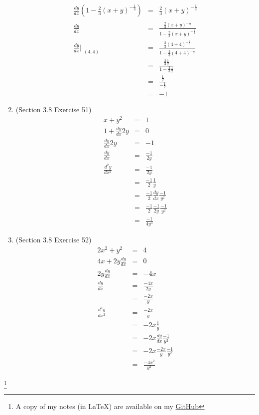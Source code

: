 \documentclass{article}
\newcommand\blfootnote[1]{
    \begingroup
    \renewcommand\thefootnote{}\footnote{#1}
    \addtocounter{footnote}{-1}
    \endgroup
}
\begin{document}
\begin{enumerate}
\begin{eqnarray}
            \frac{dy}{dx}\left(1 - \frac{2}{3}\left(x + y\right)^{-\frac{1}{3}}\right) &=& \frac{2}{3}\left(x + y\right)^{-\frac{1}{3}} \\
            \frac{dy}{dx} &=& \frac{\frac{2}{3}\left(x + y\right)^{-\frac{1}{3}}}{1 - \frac{2}{3}\left(x + y\right)^{-\frac{1}{3}}} \\
            \frac{dy}{dx}\Bigr|_{\substack{(4,4)}} &=& \frac{\frac{2}{3}\left(4 + 4\right)^{-\frac{1}{3}}}{1 - \frac{2}{3}\left(4 + 4\right)^{-\frac{1}{3}}} \\
                                                   &=& \frac{\frac{2}{3}\frac{1}{2}}{1 - \frac{2}{3}\frac{1}{2}} \\
                                                   &=& \frac{\frac{1}{2}}{- \frac{1}{2}} \\
                                                   &=& -1
        \end{eqnarray}
    \item (Section 3.8 Exercise 51)
        \begin{eqnarray}
            x + y^2 &=& 1 \\
            1 + \frac{dy}{dx}2y &=& 0 \\
            \frac{dy}{dx}2y &=& -1 \\
            \frac{dy}{dx} &=& \frac{-1}{2y} \\
            \frac{d^2y}{dx^2} &=& \frac{-1}{2y} \\
                              &=& \frac{-1}{2}\frac{1}{y} \\
                              &=& \frac{-1}{2}\frac{dy}{dx}\frac{-1}{y^2} \\
                              &=& \frac{-1}{2}\frac{-1}{2y}\frac{-1}{y^2} \\
                              &=& \frac{-1}{4y^3}
        \end{eqnarray}
    \item (Section 3.8 Exercise 52)
        \begin{eqnarray}
            2x^2 + y^2 &=& 4 \\
            4x + 2y\frac{dy}{dx} &=& 0 \\
            2y\frac{dy}{dx} &=& -4x \\
            \frac{dy}{dx} &=& \frac{-4x}{2y} \\
                          &=& \frac{-2x}{y} \\
            \frac{d^2y}{dx^2} &=& \frac{-2x}{y} \\
                              &=& -2x\frac{1}{y} \\
                              &=& -2x\frac{dy}{dx}\frac{-1}{y^2} \\
                              &=& -2x\frac{-2x}{y}\frac{-1}{y^2} \\
                              &=& \frac{-4x^2}{y^3}
        \end{eqnarray}
\end{enumerate}

\blfootnote{A copy of my notes (in \LaTeX) are available on my \href{https://github.com/onlinechronically/MATH-211}{GitHub}}
\end{document}
